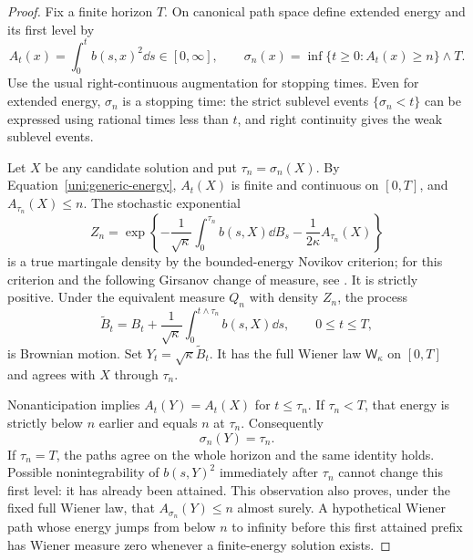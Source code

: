 \begin{proof}
Fix a finite horizon $T$. On canonical path space define extended
energy and its first level by
\[
 A_t(x)=\int_0^t b(s,x)^2\dd s\in[0,\infty],\qquad
 \sigma_n(x)=\inf\{t\ge0:A_t(x)\ge n\}\wedge T.
\]
Use the usual right-continuous augmentation for stopping times.
Even for extended energy, $\sigma_n$ is a stopping time: the
strict sublevel events $\{\sigma_n<t\}$ can be expressed using
rational times less than $t$, and right continuity gives the weak
sublevel events.

Let $X$ be any candidate solution and put $\tau_n=\sigma_n(X)$.
By Equation~\eqref{uni:generic-energy}, $A_t(X)$ is finite and
continuous on $[0,T]$, and $A_{\tau_n}(X)\le n$. The stochastic
exponential
\begin{equation}\label{uni:tilt}
 Z_n=\exp\left\{-\frac1{\sqrt\kappa}
       \int_0^{\tau_n} b(s,X)\dd B_s
       -\frac1{2\kappa}A_{\tau_n}(X)\right\}
\end{equation}
is a true martingale density by the bounded-energy Novikov
criterion; for this criterion and the following Girsanov change of
measure, see \cite[Section~5.3, Theorems~5.3.1--5.3.2 and (5.10)]{Lawler}.
It is strictly positive. Under the equivalent measure
$Q_n$ with density $Z_n$, the process
\[
 \widetilde B_t=B_t+\frac1{\sqrt\kappa}
                  \int_0^{t\wedge\tau_n}b(s,X)\dd s,
 \qquad 0\le t\le T,
\]
is Brownian motion. Set $Y_t=\sqrt\kappa\widetilde B_t$.
It has the full Wiener law $\mathsf W_\kappa$ on $[0,T]$ and
agrees with $X$ through $\tau_n$.

Nonanticipation implies $A_t(Y)=A_t(X)$ for $t\le\tau_n$.
If $\tau_n<T$, that energy is strictly below $n$ earlier and
equals $n$ at $\tau_n$. Consequently
\begin{equation}\label{uni:same-stop}
 \sigma_n(Y)=\tau_n.
\end{equation}
If $\tau_n=T$, the paths agree on the whole horizon and the same
identity holds. Possible nonintegrability of $b(s,Y)^2$ immediately
after $\tau_n$ cannot change this first level: it has already been
attained. This observation also proves, under the fixed full Wiener
law, that
$A_{\sigma_n}(Y)\le n$ almost surely. A hypothetical Wiener path
whose energy jumps from below $n$ to infinity before this first
attained prefix has Wiener measure zero whenever a finite-energy
solution exists.


\end{proof}
